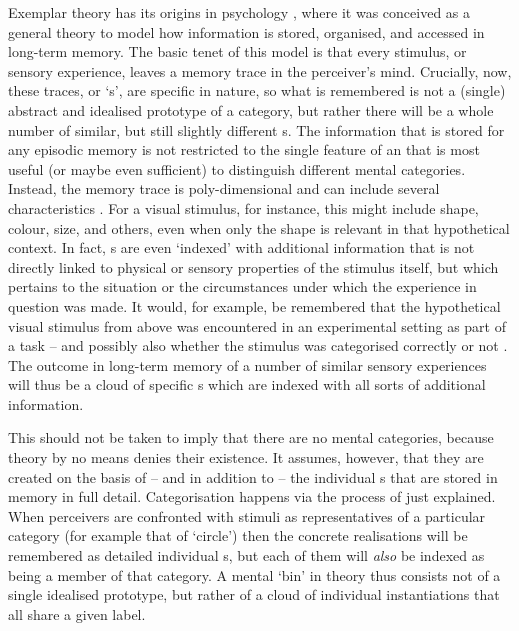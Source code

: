 Exemplar theory has its origins in psychology \parencite[cf.][]{medinschaffer1978}, where it was conceived as a general theory to model how information is stored, organised, and accessed in long-term memory.
The basic tenet of this model is that every stimulus, or sensory experience, leaves a memory trace in the perceiver's mind.
Crucially, now, these traces, or `s', are specific in nature, so what is remembered is not a (single) abstract and idealised prototype of a category, but rather there will be a whole number of similar, but still slightly different s.
The information that is stored for any episodic memory is not restricted to the single feature of an  that is most useful (or maybe even sufficient) to distinguish different mental categories.
Instead, the memory trace is poly-dimensional and can include several characteristics \parencite[cf.][517]{pierrehumbert2006}.
For a visual stimulus, for instance, this might include shape, colour, size, and others, even when only the shape is relevant in that hypothetical context.
In fact, s are even `indexed' with additional information that is not directly linked to physical or sensory properties of the stimulus itself, but which pertains to the situation or the circumstances under which the experience in question was made.
It would, for example, be remembered that the hypothetical visual stimulus from above was encountered in an experimental setting as part of a  task -- and possibly also whether the stimulus was categorised correctly or not \parencite[cf.][210--212]{medinschaffer1978}.
The outcome in long-term memory of a number of similar sensory experiences will thus be a cloud of specific s which are indexed with all sorts of additional information.

This should not be taken to imply that there are no mental categories, because  theory by no means denies their existence.
It assumes, however, that they are created on the basis of -- and in addition to -- the individual s that are stored in memory in full detail.
Categorisation happens via the process of  just explained.
When perceivers are confronted with stimuli as representatives of a particular category (for example that of `circle') then the concrete realisations will be remembered as detailed individual s, but each of them will \emph{also} be indexed as being a member of that category.
A mental `bin' in  theory thus consists not of a single idealised prototype, but rather of a cloud of individual instantiations that all share a given label.


